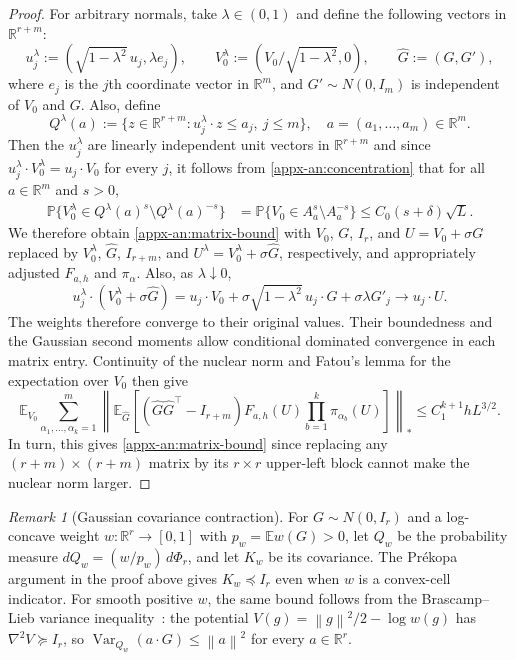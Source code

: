 \documentclass[11pt,letterpaper]{article}
\theoremstyle{remark}
\newtheorem{remark}{Remark}
\newcommand{\E}{\mathbb E}
\newcommand{\R}{\mathbb R}
\newcommand{\norm}[1]{\left\lVert#1\right\rVert}
\begin{document}
\begin{proof}
For arbitrary normals, take \(\lambda\in(0,1)\) and define the following vectors in $\R^{r+m}$:
\[
 u_j^\lambda:=(\sqrt{1-\lambda^2}\,u_j,\lambda e_j),\qquad
 V_0^\lambda:=(V_0/\sqrt{1-\lambda^2},0),\qquad
 \widehat G:=(G,G'),
\]
where \(e_j\) is the \(j\)th coordinate vector in \(\R^m\), and
\(G'\sim N(0,I_m)\) is independent of $V_0$ and $G$. Also, define
\[
Q^\lambda(a):=\{z\in\mathbb R^{r+m}:u_j^\lambda\cdot z\le a_j,\ j\le m\},\quad a=(a_1,\dots,a_m)\in\R^m.
\]
Then the \(u_j^\lambda\) are linearly independent unit vectors in $\R^{r+m}$ and
since \(u_j^\lambda\cdot V_0^\lambda=u_j\cdot V_0\) for every \(j\), it follows from \eqref{appx-an:concentration} that for all \(a\in\mathbb R^m\) and \(s>0\),
\[
\begin{aligned}
\mathbb P\{V_0^\lambda\in Q^\lambda(a)^s\setminus Q^\lambda(a)^{-s}\}
&=\mathbb P\{V_0\in A_a^s\setminus A_a^{-s}\} \le C_0(s+\delta)\sqrt L.
\end{aligned}
\]
We therefore obtain \eqref{appx-an:matrix-bound} with $V_0$, $G$, $I_r$, and $U=V_0+\sigma G$ replaced by $V_0^{\lambda}$, $\widehat G$, $I_{r+m}$, and $U^{\lambda} = V_0^{\lambda} + \sigma \widehat G$, respectively, and appropriately adjusted $F_{a, h}$ and $\pi_{\alpha}$. Also, as \(\lambda\downarrow0\),
\[
 u_j^\lambda\cdot(V_0^\lambda+\sigma\widehat G)
 =u_j\cdot V_0+\sigma\sqrt{1-\lambda^2}\,u_j\cdot G
                  +\sigma\lambda G'_j
 \longrightarrow u_j\cdot U.
\]
The weights therefore converge to their original values. Their
boundedness and the Gaussian second moments allow conditional dominated
convergence in each matrix entry. Continuity of the nuclear norm and
Fatou's lemma for the expectation over $V_0$ then give
\[
 \E_{V_0}\sum_{\alpha_1,\ldots,\alpha_k=1}^m
 \left\|\E_{\widehat G}\left[(\widehat G\widehat G^\top-I_{r+m})F_{a, h}(U)
              \prod_{b=1}^k\pi_{\alpha_b}(U)\right]\right\|_*
 \le C_1^{k+1}hL^{3/2}.
\]
In turn, this gives \eqref{appx-an:matrix-bound} since replacing any $(r+m)\times(r+m)$ matrix by its $r\times r$ upper-left block cannot make the nuclear norm larger.
\end{proof}

\begin{remark}[Gaussian covariance contraction]\label{appx-rem:covariance-contraction}
For \(G\sim N(0,I_r)\) and a log-concave weight \(w:\R^r\to[0,1]\) with
\(p_w=\E w(G)>0\), let \(Q_w\) be the probability measure
\(dQ_w=(w/p_w)\,d\Phi_r\), and let \(K_w\) be its covariance.
The Pr\'ekopa argument in the proof above gives \(K_w\preceq I_r\)
even when \(w\) is a convex-cell indicator. For smooth positive
\(w\), the same bound follows from the Brascamp--Lieb variance
inequality~\cite{BrascampLieb1976}: the potential
\(V(g)=\norm g^2/2-\log w(g)\) has \(\nabla^2V\succeq I_r\),
so \(\operatorname{Var}_{Q_w}(a\cdot G)\le\norm a^2\) for every
\(a\in\R^r\).
\end{remark}
\end{document}
